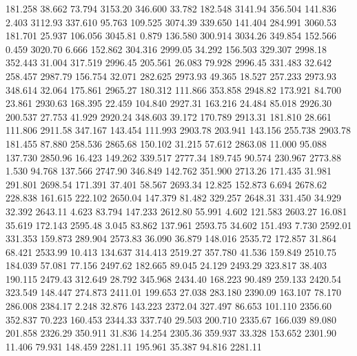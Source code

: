  181.258   38.662   73.794      3153.20
 346.600   33.782  182.548      3141.94
 356.504  141.836    2.403      3112.93
 337.610   95.763  109.525      3074.39
 339.650  141.404  284.991      3060.53
 181.701   25.937  106.056      3045.81
   0.879  136.580  300.914      3034.26
 349.854  152.566    0.459      3020.70
   6.666  152.862  304.316      2999.05
  34.292  156.503  329.307      2998.18
 352.443   31.004  317.519      2996.45
 205.561   26.083   79.928      2996.45
 331.483   32.642  258.457      2987.79
 156.754   32.071  282.625      2973.93
  49.365   18.527  257.233      2973.93
 348.614   32.064  175.861      2965.27
 180.312  111.866  353.858      2948.82
 173.921   84.700   23.861      2930.63
 168.395   22.459  104.840      2927.31
 163.216   24.484   85.018      2926.30
 200.537   27.753   41.929      2920.24
 348.603   39.172  170.789      2913.31
 181.810   28.661  111.806      2911.58
 347.167  143.454  111.993      2903.78
 203.941  143.156  255.738      2903.78
 181.455   87.880  258.536      2865.68
 150.102   31.215   57.612      2863.08
  11.000   95.088  137.730      2850.96
  16.423  149.262  339.517      2777.34
 189.745   90.574  230.967      2773.88
   1.530   94.768  137.566      2747.90
 346.849  142.762  351.900      2713.26
 171.435   31.981  291.801      2698.54
 171.391   37.401   58.567      2693.34
  12.825  152.873    6.694      2678.62
 228.838  161.615  222.102      2650.04
 147.379   81.482  329.257      2648.31
 331.450   34.929   32.392      2643.11
   4.623   83.794  147.233      2612.80
  55.991    4.602  121.583      2603.27
  16.081   35.619  172.143      2595.48
   3.045   83.862  137.961      2593.75
  34.602  151.493    7.730      2592.01
 331.353  159.873  289.904      2573.83
  36.090   36.879  148.016      2535.72
 172.857   31.864   68.421      2533.99
  10.413  134.637  314.413      2519.27
 357.780   41.536  159.849      2510.75
 184.039   57.081   77.156      2497.62
 182.665   89.045   24.129      2493.29
 323.817   38.403  190.115      2479.43
 312.649   28.792  345.968      2434.40
 168.223   90.489  259.133      2420.54
 323.549  148.447  274.873      2411.01
 199.653   27.038  283.180      2390.09
 163.107   78.170  286.008      2384.17
   2.248   32.876  143.223      2372.04
 327.497   86.653  101.110      2356.60
 352.837   70.223  160.453      2344.33
 337.740   29.503  200.710      2335.67
 166.039   89.080  201.858      2326.29
 350.911   31.836   14.254      2305.36
 359.937   33.328  153.652      2301.90
  11.406   79.931  148.459      2281.11
 195.961   35.387   94.816      2281.11

